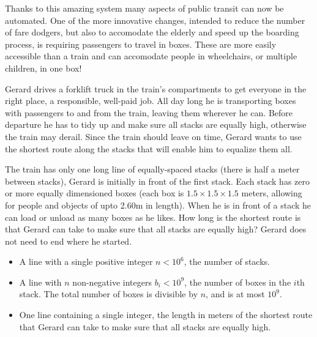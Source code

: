 


\newcommand{\joe}{Gerard}
{\StandaardZin}
Thanks to this amazing system many aspects of public transit can now be automated.
One of the more innovative changes, intended to reduce the number of fare dodgers, but also to accomodate the elderly and speed up the boarding process, is requiring passengers to travel in boxes. These are more easily accessible than a train and can accomodate people in wheelchairs, or multiple children, in one box! %


{\joe} drives a forklift truck in the train's compartments to get everyone in the right place, a responsible, well-paid job. All day long he is transporting boxes with passengers to and from the train, leaving them wherever he can. Before departure he has to tidy up and make sure all stacks are equally high, otherwise the train may derail. Since the train should leave on time, {\joe} wants to use the shortest route along the stacks that will enable him to equalize them all.

The train has only one long line of equally-spaced stacks (there is half a meter between stacks), {\joe} is initially in front of the first stack. Each stack has zero or more equally dimensioned boxes (each box is $1.5\times1.5\times1.5$ meters, allowing for people and objects of upto 2.60m in length). When he is in front of a stack he can load or unload as many boxes as he likes. How long is the shortest route is that {\joe} can take to make sure that all stacks are equally high? {\joe} does not need to end where he started.

\Input
\begin{itemize}
 \item A line with a single positive integer $n<10^6$, the number of stacks.
 \item A line with $n$ non-negative integers $b_i < 10^9$, the number of boxes in the $i$th stack.
       The total number of boxes is divisible by $n$, and is at most $10^9$.
\end{itemize}

\Output
\begin{itemize}
 \item One line containing a single integer, the length in meters of the shortest route that {\joe} can take to make sure that all stacks are equally high.
\end{itemize}

\Example
